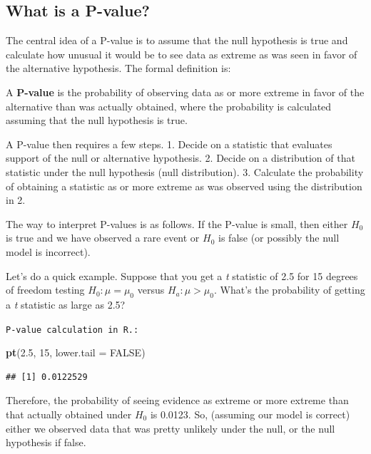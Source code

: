 \documentclass[]{article}
\newenvironment{Shaded}{\begin{snugshade}}{\end{snugshade}}
\newcommand{\KeywordTok}[1]{\textcolor[rgb]{0.13,0.29,0.53}{\textbf{{#1}}}}
\newcommand{\DataTypeTok}[1]{\textcolor[rgb]{0.13,0.29,0.53}{{#1}}}
\newcommand{\DecValTok}[1]{\textcolor[rgb]{0.00,0.00,0.81}{{#1}}}
\newcommand{\FloatTok}[1]{\textcolor[rgb]{0.00,0.00,0.81}{{#1}}}
\newcommand{\OtherTok}[1]{\textcolor[rgb]{0.56,0.35,0.01}{{#1}}}
\newcommand{\NormalTok}[1]{{#1}}
\begin{document}
\subsection{What is a P-value?}\label{what-is-a-p-value}

The central idea of a P-value is to assume that the null hypothesis is
true and calculate how unusual it would be to see data as extreme as was
seen in favor of the alternative hypothesis. The formal definition is:

A \textbf{P-value} is the probability of observing data as or more
extreme in favor of the alternative than was actually obtained, where
the probability is calculated assuming that the null hypothesis is true.

A P-value then requires a few steps. 1. Decide on a statistic that
evaluates support of the null or alternative hypothesis. 2. Decide on a
distribution of that statistic under the null hypothesis (null
distribution). 3. Calculate the probability of obtaining a statistic as
or more extreme as was observed using the distribution in 2.

The way to interpret P-values is as follows. If the P-value is small,
then either $H_0$ is true and we have observed a rare event or $H_0$ is
false (or possibly the null model is incorrect).

Let's do a quick example. Suppose that you get a \emph{t} statistic of
2.5 for 15 degrees of freedom testing $H_0:\mu = \mu_0$ versus
$H_a : \mu > \mu_0$. What's the probability of getting a \emph{t}
statistic as large as 2.5?

\vspace{1pc}

\verb;P-value calculation in R.:;

\begin{Shaded}
\begin{Highlighting}[]
\KeywordTok{pt}\NormalTok{(}\FloatTok{2.5}\NormalTok{, }\DecValTok{15}\NormalTok{, }\DataTypeTok{lower.tail =} \OtherTok{FALSE}\NormalTok{)}
\end{Highlighting}
\end{Shaded}

\begin{verbatim}
## [1] 0.0122529
\end{verbatim}

Therefore, the probability of seeing evidence as extreme or more extreme
than that actually obtained under $H_0$ is 0.0123. So, (assuming our
model is correct) either we observed data that was pretty unlikely under
the null, or the null hypothesis if false.
\end{document}
